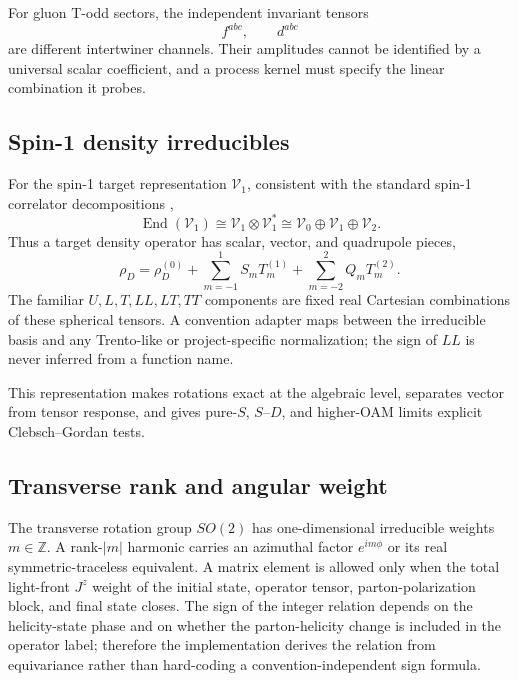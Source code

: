 \documentclass[11pt]{article}
\newcommand{\End}{\operatorname{End}}
\newcommand{\Rep}{\mathcal V}
\begin{document}
For gluon T-odd sectors, the independent invariant tensors
\begin{equation}
 f^{abc},\qquad d^{abc}
\label{eq:f-d-tensors}
\end{equation}
are different intertwiner channels.  Their amplitudes cannot be identified by
a universal scalar coefficient, and a process kernel must specify the linear
combination it probes.

\subsection{Spin-1 density irreducibles}

For the spin-1 target representation \(\Rep_1\), consistent with the standard spin-1 correlator decompositions \cite{BacchettaMulders2000,KumanoSong2021,Boer2016},
\begin{equation}
 \End(\Rep_1)
 \cong \Rep_1\otimes\Rep_1^*
 \cong \Rep_0\oplus\Rep_1\oplus\Rep_2.
\label{eq:spin1-end-decomposition}
\end{equation}
Thus a target density operator has scalar, vector, and quadrupole pieces,
\begin{equation}
 \rho_D=
 \rho_D^{(0)}
 +\sum_{m=-1}^{1}S_m T_m^{(1)}
 +\sum_{m=-2}^{2}Q_m T_m^{(2)}.
\label{eq:spin1-density-decomposition}
\end{equation}
The familiar \(U,L,T,LL,LT,TT\) components are fixed real Cartesian
combinations of these spherical tensors.  A convention adapter maps between
the irreducible basis and any Trento-like or project-specific normalization;
the sign of \(LL\) is never inferred from a function name.

This representation makes rotations exact at the algebraic level,
separates vector from tensor response, and gives pure-\(S\), \(S\)--\(D\),
and higher-OAM limits explicit Clebsch--Gordan tests.

\subsection{Transverse rank and angular weight}

The transverse rotation group \(SO(2)\) has one-dimensional irreducible
weights \(m\in\mathbb Z\).  A rank-\(|m|\) harmonic carries an azimuthal
factor \(e^{im\phi}\) or its real symmetric-traceless equivalent.  A matrix
element is allowed only when the total light-front \(J^z\) weight of the
initial state, operator tensor, parton-polarization block, and final state
closes.  The sign of the integer relation depends on the helicity-state phase
and on whether the parton-helicity change is included in the operator label;
therefore the implementation derives the relation from equivariance rather
than hard-coding a convention-independent sign formula.
\end{document}
